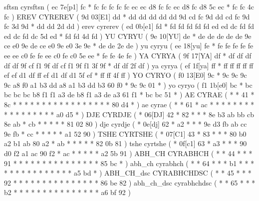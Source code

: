 \makecod sftsn        cyrsftsn          ( ec 7e[p1]  fc *   fc fc fc fc    fc ec ec d8 fc    fc ec d8 fc    d8 5c ec    *   fc fc   4c fc  )
\makeCOD EREV         CYREREV           ( 9d 03[E1]  dd *   dd dd dd dd    dd 9d cd fc 9d    dd cd fc 9d    fc 3d 9d    *   dd dd   2d dd  )
\makecod erev         cyrerev           ( ed 0b[e1]  fd *   fd fd fd fd    fd ed ed dc fd    fd ed dc fd    dc 5d ed    *   fd fd   4d fd  )
\makeCOD YU           CYRYU             ( 9e 10[YU]  de *   de de de de    de 9e ce e0 9e    de ce e0 9e    e0 3e 9e    *   de de   2e de  )
\makecod yu           cyryu             ( ee 18[yu]  fe *   fe fe fe fe    fe ee ee c0 fe    fe ee c0 fe    c0 5e ee    *   fe fe   4e fe  )
\makeCOD YA           CYRYA             ( 9f 17[YA]  df *   df df df df    df 9f cf f1 9f    df cf f1 9f    f1 3f 9f    *   df df   2f df  )
\makecod ya           cyrya             ( ef 1f[ya]  ff *   ff ff ff ff    ff ef ef d1 df    ff ef d1 df    d1 5f ef    *   ff ff   4f ff  )
\makeCOD YO           CYRYO             ( f0 13[E0]  9c *   9c 9c 9c 9c    a8 f0 a1 b3 dd    a8 a1 b3 dd    b3 60 f0    *   9c 9c   01 *   )
\makecod yo           cyryo             ( f1 1b[e0]  bc *   bc bc bc bc    b8 f1 f1 a3 de    b8 f1 a3 de    a3 61 f1    *   bc bc   51 *   )
\makeCOD AE           CYRAE             ( *  *       41 *   8c *  *  *     *  *  *  *  *     *  *  *  *     *  *  *     *   *  80   d4 *   )
\makecod ae           cyrae             ( *  *       61 *   ac *  *  *     *  *  *  *  *     *  *  *  *     *  *  *     *   *  a0   d5 *   )
\makeCOD DJE          CYRDJE            ( *  06[DJ]  42 *   82 *  *  *     8e b3 ab bb cb    8e ab *  cb    *  *  *     *   *  81   02 80  )
\makecod dje          cyrdje            ( *  0e[dj]  62 *   a2 *  *  *     9e d3 fb ab cc    9e fb *  cc    *  *  *     *   *  a1   52 90  )
\makeCOD TSHE         CYRTSHE           ( *  07[C1]  43 *   83 *  *  *     80 b0 a2 b1 ab    80 a2 *  ab    *  *  *     *   *  82   0b 81  )
\makecod tshe         cyrtshe           ( *  0f[c1]  63 *   a3 *  *  *     90 d0 f2 a1 ac    90 f2 *  ac    *  *  *     *   *  a2   5b 91  )
\makeCOD ABH_CH       CYRABHCH          ( *  *       44 *   *  *  91 *     *  *  *  *  *     *  *  *  *     *  *  *     *   *  85   bc *   )
\makecod abh_ch       cyrabhch          ( *  *       64 *   *  *  b1 *     *  *  *  *  *     *  *  *  *     *  *  *     *   *  a5   bd *   )
\makeCOD ABH_CH_dsc   CYRABHCHDSC       ( *  *       45 *   *  *  92 *     *  *  *  *  *     *  *  *  *     *  *  *     *   *  86   be 82  )
\makecod abh_ch_dsc   cyrabhchdsc       ( *  *       65 *   *  *  b2 *     *  *  *  *  *     *  *  *  *     *  *  *     *   *  a6   bf 92  )
